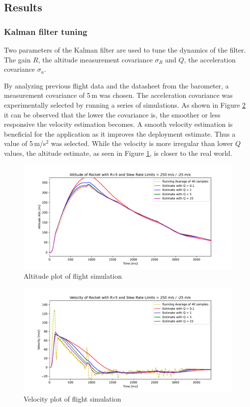 \newpage

\subsection{Results}

\subsubsection{Kalman filter tuning}\label{filter-tuning}
Two parameters of the Kalman filter are used to tune the dynamics of the filter. The gain $R$, the altitude measurement covariance $\sigma_R$ and $Q$, the acceleration covariance $\sigma_a$. 

By analyzing previous flight data and the datasheet from the barometer, a measurement covariance of 5\,m was chosen. The acceleration covariance was experimentally selected by running a series of simulations. As shown in Figure \ref{fig:tune-velocity} it can be observed that the lower the covariance is, the smoother or less responsive the velocity estimation becomes. A smooth velocity estimation is beneficial for the application as it improves the deployment estimate. Thus a value of 5\,{m/s}$^2$ was selected. While the velocity is more irregular than lower $Q$ values, the altitude estimate, as seen in Figure \ref{fig:tune-altitude}, is closer to the real world.   

\begin{figure}[h!]
	\centering
	\includegraphics[width=\textwidth]{plots/altitude-tune}
	\caption{Altitude plot of flight simulation}
	\label{fig:tune-altitude}
\end{figure}

\begin{figure}[h!]
	\centering
	\includegraphics[width=\textwidth]{plots/velocity-tune}
	\caption{Velocity plot of flight simulation}
	\label{fig:tune-velocity}
\end{figure}

